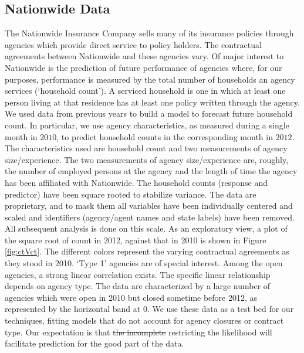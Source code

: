 \documentclass[12pt]{article}
\newcommand{\green}[1]{{\color{green}#1}}
\begin{document}
\subsection{Nationwide Data}
The Nationwide Insurance Company sells many of its insurance policies through agencies which provide direct service to policy holders.  
The contractual agreements between Nationwide and these agencies vary.  Of major interest to Nationwide is the prediction of future performance of agencies where, for our purposes,  performance is measured by the total number of households an agency services (`household count'). A serviced household is one in which at least one person living at that residence has at least one policy written through the agency. We used data from previous years to build a model to forecast future household count. In particular, we use agency characteristics, as measured during a single month in $2010$, to predict household counts in the corresponding month in $2012$. The characteristics used are household count and two measurements of agency size/experience. The two measurements of agency size/experience are, roughly, the number of employed persons at the agency and the length of time the agency has been affiliated with Nationwide. The household counts (response and predictor) have been square rooted to stabilize variance. The data are 
proprietary, and to mask them all variables have been individually centered and scaled and identifiers (agency/agent names and state
labels) have been removed. 
All subsequent analysis is done on this scale.  As an exploratory view, a plot of the square root of count in 2012, against that in 2010 
is shown in Figure \ref{fig:ctVct}.  The different colors represent the varying contractual agreements as they stood in 2010. `Type 1' agencies are of special interest.  Among the open agencies, a strong linear correlation exists.  The specific linear relationship
depends on agency type. The data are characterized by a large number of agencies which were open in 2010 but closed sometime before 2012, as represented by the horizontal band at $0$. We use these data as a test bed for our techniques, fitting models that do not account for agency closures or contract type.  Our expectation is that \green{\sout{the incomplete} restricting the} likelihood will facilitate prediction for the good part of the data.  
\end{document}

